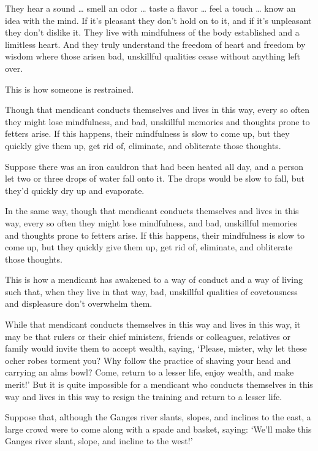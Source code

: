 \documentclass[12pt,openany]{book}%
\begin{document}
They hear a sound … smell an odor … taste a flavor … feel a touch … know an idea with the mind. If it’s pleasant they don’t hold on to it, and if it’s unpleasant they don’t dislike it. They live with mindfulness of the body established and a limitless heart. And they truly understand the freedom of heart and freedom by wisdom where those arisen bad, unskillful qualities cease without anything left over. 

This is how someone is restrained. 

Though that mendicant conducts themselves and lives in this way, every so often they might lose mindfulness, and bad, unskillful memories and thoughts prone to fetters arise. If this happens, their mindfulness is slow to come up, but they quickly give them up, get rid of, eliminate, and obliterate those thoughts. 

Suppose there was an iron cauldron that had been heated all day, and a person let two or three drops of water fall onto it. The drops would be slow to fall, but they’d quickly dry up and evaporate. 

In the same way, though that mendicant conducts themselves and lives in this way, every so often they might lose mindfulness, and bad, unskillful memories and thoughts prone to fetters arise. If this happens, their mindfulness is slow to come up, but they quickly give them up, get rid of, eliminate, and obliterate those thoughts. 

This is how a mendicant has awakened to a way of conduct and a way of living such that, when they live in that way, bad, unskillful qualities of covetousness and displeasure don’t overwhelm them. 

While that mendicant conducts themselves in this way and lives in this way, it may be that rulers or their chief ministers, friends or colleagues, relatives or family would invite them to accept wealth, saying, ‘Please, mister, why let these ocher robes torment you? Why follow the practice of shaving your head and carrying an alms bowl? Come, return to a lesser life, enjoy wealth, and make merit!’ But it is quite impossible for a mendicant who conducts themselves in this way and lives in this way to resign the training and return to a lesser life. 

Suppose that, although the Ganges river slants, slopes, and inclines to the east, a large crowd were to come along with a spade and basket, saying: ‘We’ll make this Ganges river slant, slope, and incline to the west!’ 
\end{document}
